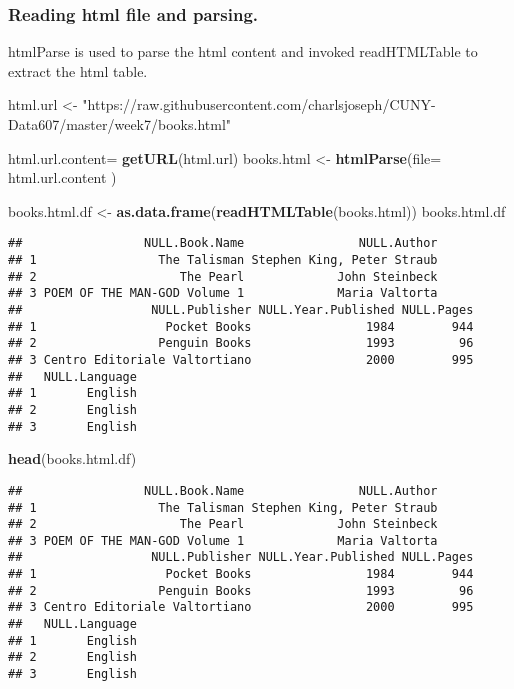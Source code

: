 \documentclass[]{article}
\newenvironment{Shaded}{\begin{snugshade}}{\end{snugshade}}
\newcommand{\KeywordTok}[1]{\textcolor[rgb]{0.13,0.29,0.53}{\textbf{#1}}}
\newcommand{\DataTypeTok}[1]{\textcolor[rgb]{0.13,0.29,0.53}{#1}}
\newcommand{\StringTok}[1]{\textcolor[rgb]{0.31,0.60,0.02}{#1}}
\newcommand{\NormalTok}[1]{#1}
\begin{document}
\subsubsection{Reading html file and
parsing.}\label{reading-html-file-and-parsing.}

htmlParse is used to parse the html content and invoked readHTMLTable to
extract the html table.

\begin{Shaded}
\begin{Highlighting}[]
\NormalTok{html.url <-}\StringTok{ "https://raw.githubusercontent.com/charlsjoseph/CUNY-Data607/master/week7/books.html"}

\NormalTok{html.url.content=}\StringTok{ }\KeywordTok{getURL}\NormalTok{(html.url)}
\NormalTok{books.html <-}\StringTok{ }\KeywordTok{htmlParse}\NormalTok{(}\DataTypeTok{file=}\NormalTok{ html.url.content )}


\NormalTok{books.html.df <-}\StringTok{ }\KeywordTok{as.data.frame}\NormalTok{(}\KeywordTok{readHTMLTable}\NormalTok{(books.html))}
\NormalTok{books.html.df}
\end{Highlighting}
\end{Shaded}

\begin{verbatim}
##                 NULL.Book.Name                NULL.Author
## 1                 The Talisman Stephen King, Peter Straub
## 2                    The Pearl             John Steinbeck
## 3 POEM OF THE MAN-GOD Volume 1             Maria Valtorta
##                  NULL.Publisher NULL.Year.Published NULL.Pages
## 1                  Pocket Books                1984        944
## 2                 Penguin Books                1993         96
## 3 Centro Editoriale Valtortiano                2000        995
##   NULL.Language
## 1       English
## 2       English
## 3       English
\end{verbatim}

\begin{Shaded}
\begin{Highlighting}[]
\KeywordTok{head}\NormalTok{(books.html.df)}
\end{Highlighting}
\end{Shaded}

\begin{verbatim}
##                 NULL.Book.Name                NULL.Author
## 1                 The Talisman Stephen King, Peter Straub
## 2                    The Pearl             John Steinbeck
## 3 POEM OF THE MAN-GOD Volume 1             Maria Valtorta
##                  NULL.Publisher NULL.Year.Published NULL.Pages
## 1                  Pocket Books                1984        944
## 2                 Penguin Books                1993         96
## 3 Centro Editoriale Valtortiano                2000        995
##   NULL.Language
## 1       English
## 2       English
## 3       English
\end{verbatim}
\end{document}
